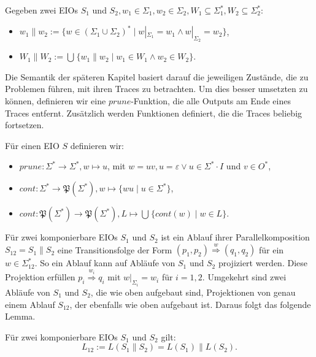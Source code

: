 \begin{Def}
  Gegeben zwei EIOs $S_1$ und $S_2,
  w_1\in\Sigma _1, w_2\in\Sigma _2, W_1\subseteq\Sigma _1^*, W_2\subseteq\Sigma
  _2^*$:
  \begin{itemize}
    \item $w_1\| w_2:=\{w\in (\Sigma _1\cup\Sigma _2)^*\mid w|_{\Sigma _1}=w_1\wedge
      w|_{\Sigma _2}=w_2\}$,
    \item $W_1\| W_2:=\bigcup\hspace{1pt}\{w_1\| w_2\mid w_1\in W_1\wedge w_2\in W_2\}$.
  \end{itemize}
\end{Def}

Die Semantik der späteren Kapitel basiert darauf die jeweiligen Zustände, die
zu Problemen führen, mit ihren Traces zu betrachten. Um dies besser umsetzten zu
können, definieren wir eine $prune$-Funktion, die alle Outputs am Ende
eines Traces entfernt. Zusätzlich werden Funktionen definiert, die
die Traces beliebig fortsetzen.

\begin{Def}
  Für einen EIO $S$ definieren wir:
  \begin{itemize}
    \item $prune:\Sigma ^*\rightarrow\Sigma ^*, w\mapsto u$, mit $w=uv,
      u=\varepsilon\vee u\in\Sigma ^*\cdot I$ und $v\in O^*$,
    \item $cont:\Sigma ^*\rightarrow\mathfrak{P}(\Sigma ^*),
      w\mapsto\{wu\mid u\in\Sigma ^*\}$,
    \item $cont:\mathfrak{P}(\Sigma ^*)\rightarrow\mathfrak{P}(\Sigma ^*),
      L\mapsto\bigcup\hspace{1pt}\{cont(w)\mid w\in L\}$.
  \end{itemize}
\end{Def}

Für zwei komponierbare EIOs $S_1$ und $S_2$ ist ein Ablauf ihrer
Parallelkomposition $S_{12}=S_1\| S_2$ eine Transitionsfolge der Form $(p_1,p_2)
\overset{w}{\Rightarrow} (q_1,q_2)$ für ein $w\in\Sigma_{12}^*$. So ein Ablauf
kann auf Abläufe von $S_1$ und $S_2$ projiziert werden. Diese Projektion
erfüllen $p_i \overset{w_i}{\Rightarrow} q_i$ mit $w|_{\Sigma
_i}=w_i$ für $i=1,2$. Umgekehrt sind zwei Abläufe von $S_1$ und $S_2$,
die wie oben aufgebaut sind, Projektionen von genau einem Ablauf
$S_{12}$, der ebenfalls wie oben aufgebaut ist. Daraus folgt das folgende Lemma.

\begin{lem}
  \label{LemmaSprache}
  Für zwei komponierbare EIOs $S_1$ und $S_2$ gilt: \[L_{12} := L(S_1\|S_2) =
  L(S_1)\|L(S_2).\]
\end{lem}
